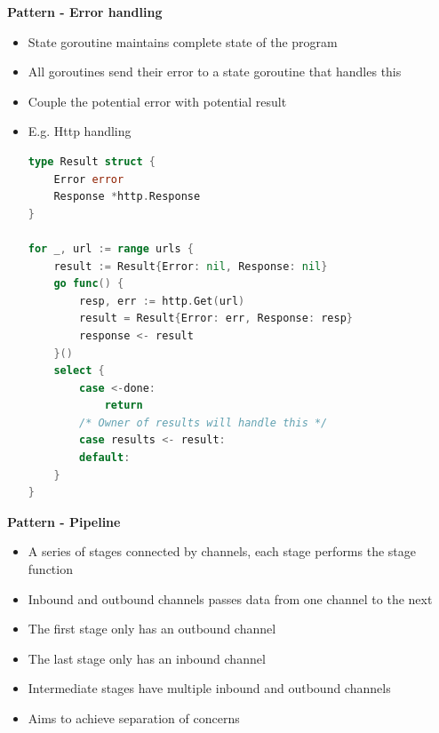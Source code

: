 \documentclass[10pt, landscape]{article}
\begin{document}
\begin{multicols}{4}
\textbf{Pattern - Error handling} \\
\begin{itemize}
    \item State goroutine maintains complete state of the program 
    \item All goroutines send their error to a state goroutine that handles this 
    \item Couple the potential error with potential result 
    \item E.g. Http handling 
\begin{lstlisting}[language=Go, breaklines=true, breakatwhitespace=true]
type Result struct {
    Error error
    Response *http.Response
}

for _, url := range urls {
    result := Result{Error: nil, Response: nil}
    go func() {
        resp, err := http.Get(url)
        result = Result{Error: err, Response: resp}
        response <- result
    }()
    select {
        case <-done:
            return
        /* Owner of results will handle this */
        case results <- result:
        default:
    }
}    
\end{lstlisting}
\end{itemize}

\textbf{Pattern - Pipeline} \\
\begin{itemize}
    \item A series of stages connected by channels, each stage performs the stage function
    \item Inbound and outbound channels passes data from one channel to the next
    \item The first stage only has an outbound channel
    \item The last stage only has an inbound channel 
    \item Intermediate stages have multiple inbound and outbound channels
    \item Aims to achieve separation of concerns
\end{itemize}


\end{multicols}
\end{document}
